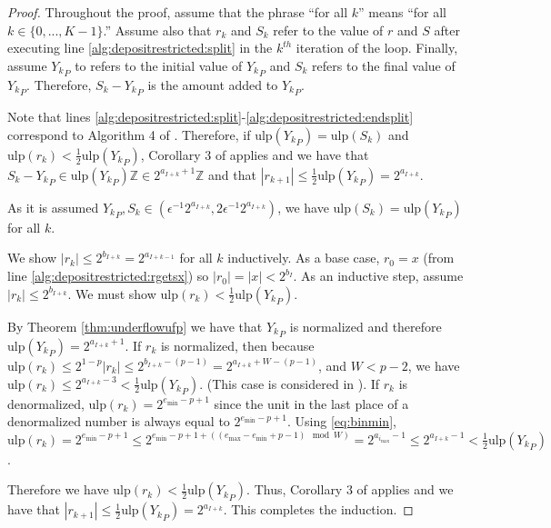 \documentclass[12pt]{article}
\providecommand{\Z}{\ensuremath{\mathbb{Z}}}
\providecommand{\min}{\ensuremath{\text{min}}}
\providecommand{\max}{\ensuremath{\text{max}}}
\providecommand{\ulp}{\ensuremath{\text{ulp}}}
\theoremstyle{definition}
\numberwithin{equation}{section}
\numberwithin{figure}{section}
\begin{document}
      \begin{proof}
        Throughout the proof, assume that the phrase ``for all $k$'' means ``for all $k \in \{0, ..., K - 1\}$.'' Assume also that $r_k$ and $S_k$ refer to the value of $r$ and $S$ after executing line \ref{alg:depositrestricted:split} in the $k^{th}$ iteration of the loop. Finally, assume ${Y_k}_P$ to refers to the initial value of ${Y_k}_P$ and $S_k$ refers to the final value of ${Y_k}_P$. Therefore, $S_k - {Y_k}_P$ is the amount added to ${Y_k}_P$.

        Note that lines \ref{alg:depositrestricted:split}-\ref{alg:depositrestricted:endsplit} correspond to Algorithm 4 of \cite{repsum}.
        Therefore, if $\ulp({Y_k}_P) = \ulp(S_k)$ and $\ulp(r_k) < \frac{1}{2}\ulp({Y_k}_P)$, Corollary 3 of \cite{repsum} applies and we have that $S_k - {Y_k}_P \in \ulp({Y_k}_P)\Z \in 2^{a_{I + k} + 1}\Z$ and that $|r_{k + 1}| \leq \frac{1}{2}\ulp({Y_k}_P) = 2^{a_{I + k}}$.

        As it is assumed ${Y_k}_P, S_k \in (\epsilon^{-1}  2^{a_{I + k}}, 2  \epsilon^{-1}  2^{a_{I + k}})$, we have $\ulp(S_k) = \ulp({Y_k}_P)$ for all $k$.

        We show $|r_k| \leq 2^{b_{I + k}} = 2^{a_{I + k - 1}}$ for all $k$ inductively. As a base case, $r_0 = x$ (from line \ref{alg:depositrestricted:rgetsx}) so $|r_0| = |x| < 2^{b_{I}}$.
        As an inductive step, assume $|r_k| \leq 2^{b_{I + k}}$. We must show $\ulp(r_k) < \frac{1}{2}\ulp({Y_k}_P)$.

        By Theorem \ref{thm:underflowufp} we have that ${Y_k}_P$ is normalized and therefore $\ulp({Y_k}_P) = 2^{a_{I + k} + 1}$.
        If $r_k$ is normalized, then because $\ulp(r_k) \leq 2^{1 - p}|r_k| \leq 2^{b_{I + k} - (p - 1)} = 2^{a_{I + k} + W - (p - 1)}$, and $W < p - 2$, we have $\ulp(r_k) \leq 2^{a_{I + k} - 3} < \frac{1}{2}\ulp({Y_k}_P)$. (This case is considered in \cite{repsum}).
      If $r_k$ is denormalized, $\ulp(r_k) = 2^{e_{\min} - p + 1}$ since the unit in the last place of a denormalized number is always equal to $2^{e_{\min} - p + 1}$. Using \eqref{eq:binmin}, $\ulp(r_k) = 2^{e_{\min} - p + 1} \leq 2^{e_{\min} - p + 1 + ((e_{\max} - e_{\min} + p - 1) \mod W)} = 2^{a_{i_{\max}} - 1} \leq 2^{a_{I + k} - 1} < \frac{1}{2}\ulp({Y_k}_P)$.

        Therefore we have $\ulp(r_k) < \frac{1}{2}\ulp({Y_k}_P)$. Thus, Corollary 3 of \cite{repsum} applies and we have that $|r_{k + 1}| \leq \frac{1}{2}\ulp({Y_k}_P) = 2^{a_{I + k}}$. This completes the induction.


\end{proof}
\end{document}
